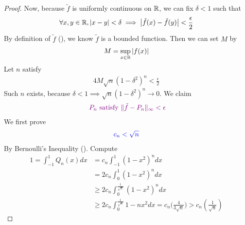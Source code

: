 \documentclass{report}
\begin{document}
\begin{proof}
Now, because $\tilde{f}$ is uniformly continuous on $\mathbb{R}$, we can fix $\delta<1$ such that 
\begin{align}
\label{tse5}
\forall x,y \in\mathbb{R}, \left|x-y\right|<\delta \implies \left|\tilde{f}(x)-\tilde{f}(y)  \right|<\frac{\epsilon}{2}
\end{align}
By definition of $\tilde{f}$ (), we know $\tilde{f} $ is a bounded function. Then we can set $M$ by 
\begin{align*}
M=\sup_{x \in\mathbb{R}} \left|f(x)\right|
\end{align*}
Let $n$ satisfy 
 \begin{align}
  \label{tse5}
4M \sqrt{n} (1-\delta^2)^n < \frac{\epsilon}{2} 
\end{align}
Such $n$ exists, because  $\delta<1 \implies  \sqrt{n}(1-\delta^2)^n \to 0 $. We claim 
\begin{align*}
\textcolor{violet}{\text{ $P_n$ satisfy $\| \tilde{f}-P_n \|_{\infty}<\epsilon $}}
\end{align*}
We first prove 
\begin{align*}
\textcolor{blue}{c_n< \sqrt{n} }
\end{align*}
By Bernoulli's Inequality (). Compute 
\begin{align*}
1=\int_{-1}^1 Q_n(x)dx&=  c_n\int_{-1}^1 (1-x^2)^n dx \\
&=2c_n\int_0^1 (1-x^2)^n dx\\
&\geq 2c_n\int_0^{\frac{1}{\sqrt{n} }}(1-x^2)^n dx\\
&\geq 2c_n \int_0^{\frac{1}{\sqrt{n} }} 1-nx^2dx=c_n\big(\frac{4}{3\sqrt{n} } \big)> c_n (\frac{1}{\sqrt{n} })
\end{align*}



\end{proof}
\end{document}
